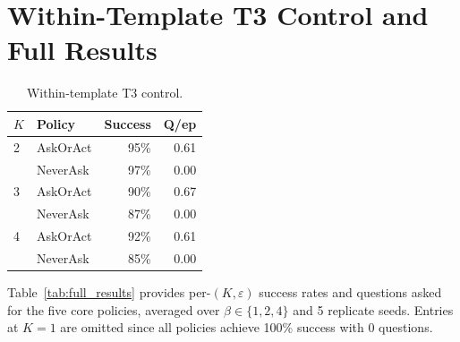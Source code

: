 \documentclass[10pt,twocolumn]{article}
\begin{document}
\section{Within-Template T3 Control and Full Results}
\label{app:full_results}
\label{app:t3}

\begin{table}[h]
\centering
\caption{Within-template T3 control.}
\label{tab:t3}
\scriptsize
\begin{tabular}{llrr}
\toprule
$K$ & Policy & Success & Q/ep \\
\midrule
2 & AskOrAct & 95\% & 0.61 \\
  & NeverAsk & 97\% & 0.00 \\
\midrule
3 & AskOrAct & 90\% & 0.67 \\
  & NeverAsk & 87\% & 0.00 \\
\midrule
4 & AskOrAct & 92\% & 0.61 \\
  & NeverAsk & 85\% & 0.00 \\
\bottomrule
\end{tabular}
\end{table}

Table~\ref{tab:full_results} provides per-$(K, \varepsilon)$ success rates and questions asked for the five core policies, averaged over $\beta \in \{1, 2, 4\}$ and 5 replicate seeds.
Entries at $K{=}1$ are omitted since all policies achieve 100\% success with 0 questions.
\end{document}
